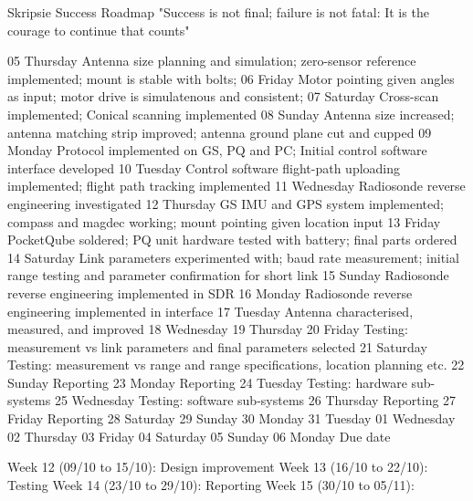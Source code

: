 Skripsie Success Roadmap
"Success is not final; failure is not fatal: It is the courage to continue that counts"

05 Thursday         Antenna size planning and simulation; zero-sensor reference implemented; mount is stable with bolts;
06 Friday           Motor pointing given angles as input; motor drive is simulatenous and consistent;
07 Saturday         Cross-scan implemented; Conical scanning implemented
08 Sunday           Antenna size increased; antenna matching strip improved; antenna ground plane cut and cupped
09 Monday           Protocol implemented on GS, PQ and PC; Initial control software interface developed
10 Tuesday          Control software flight-path uploading implemented; flight path tracking implemented 
11 Wednesday        Radiosonde reverse engineering investigated
12 Thursday         GS IMU and GPS system implemented; compass and magdec working; mount pointing given location input
13 Friday           PocketQube soldered; PQ unit hardware tested with battery; final parts ordered 
14 Saturday         Link parameters experimented with; baud rate measurement; initial range testing and parameter confirmation for short link
15 Sunday           Radiosonde reverse engineering implemented in SDR
16 Monday           Radiosonde reverse engineering implemented in interface
17 Tuesday          Antenna characterised, measured, and improved
18 Wednesday        
19 Thursday         
20 Friday           Testing: measurement vs link parameters and final parameters selected
21 Saturday         Testing: measurement vs range and range specifications, location planning etc.
22 Sunday           Reporting
23 Monday           Reporting
24 Tuesday          Testing: hardware sub-systems
25 Wednesday        Testing: software sub-systems
26 Thursday         Reporting
27 Friday           Reporting
28 Saturday
29 Sunday
30 Monday
31 Tuesday
01 Wednesday
02 Thursday
03 Friday
04 Saturday
05 Sunday
06 Monday           Due date

Week 12 (09/10 to 15/10): Design improvement
Week 13 (16/10 to 22/10): Testing
Week 14 (23/10 to 29/10): Reporting
Week 15 (30/10 to 05/11):